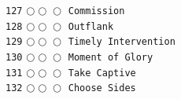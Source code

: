 \documentclass[a4paper,landscape]{article}
\begin{document}
\begin{multicols*}{5}
\texttt{127} \(\bigcirc\!\bigcirc\!\bigcirc\)  \texttt{Commission} \vspace{-0.3mm}\\ 
\texttt{128} \(\bigcirc\!\bigcirc\!\bigcirc\)  \texttt{Outflank} \vspace{-0.3mm}\\ 
\texttt{129} \(\bigcirc\!\bigcirc\!\bigcirc\)  \texttt{Timely Intervention} \vspace{-0.3mm}\\ 
\texttt{130} \(\bigcirc\!\bigcirc\!\bigcirc\)  \texttt{Moment of Glory} \vspace{-0.3mm}\\ 
\texttt{131} \(\bigcirc\!\bigcirc\!\bigcirc\)  \texttt{Take Captive} \vspace{-0.3mm}\\ 
\texttt{132} \(\bigcirc\!\bigcirc\!\bigcirc\)  \texttt{Choose Sides} \vspace{-0.3mm}\\ 

\end{multicols*}
\end{document}
